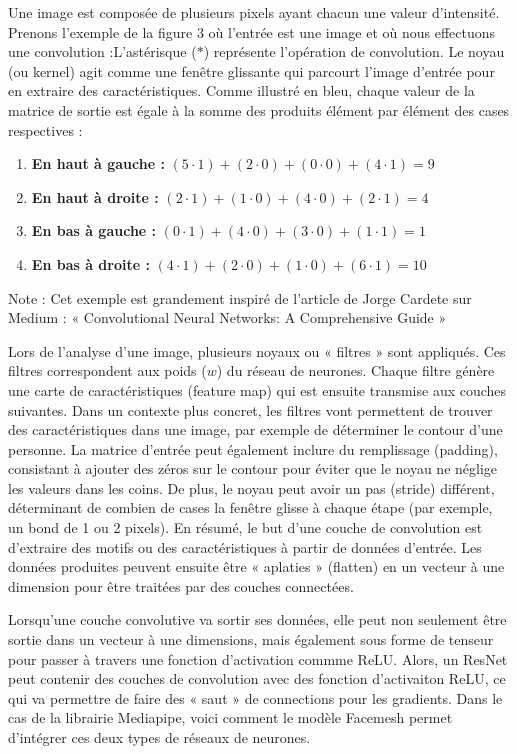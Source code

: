 \documentclass{rapportbrebeuf}
\begin{document}
Une image est composée de plusieurs pixels ayant chacun une valeur d’intensité. Prenons l’exemple de la figure 3 où l’entrée est une image et où nous effectuons une convolution :L’astérisque ($*$) représente l’opération de convolution. Le noyau (ou kernel) agit comme une fenêtre glissante qui parcourt l’image d’entrée pour en extraire des caractéristiques. Comme illustré en bleu, chaque valeur de la matrice de sortie est égale à la somme des produits élément par élément des cases respectives :

\begin{enumerate}
    \item \textbf{En haut à gauche :} $(5 \cdot 1) + (2 \cdot 0) + (0 \cdot 0) + (4 \cdot 1) = 9$
    \item \textbf{En haut à droite :} $(2 \cdot 1) + (1 \cdot 0) + (4 \cdot 0) + (2 \cdot 1) = 4$
    \item \textbf{En bas à gauche :} $(0 \cdot 1) + (4 \cdot 0) + (3 \cdot 0) + (1 \cdot 1) = 1$
    \item \textbf{En bas à droite :} $(4 \cdot 1) + (2 \cdot 0) + (1 \cdot 0) + (6 \cdot 1) = 10$
\end{enumerate}

Note : Cet exemple est grandement inspiré de l'article de Jorge Cardete sur Medium : « Convolutional Neural Networks: A Comprehensive Guide » \cite{cardete2024cnn}


Lors de l'analyse d’une image, plusieurs noyaux ou « filtres » sont appliqués. Ces filtres correspondent aux poids ($w$) du réseau de neurones. Chaque filtre génère une carte de caractéristiques (feature map) qui est ensuite transmise aux couches suivantes. Dans un contexte plus concret, les filtres vont permettent de trouver des caractéristiques dans une image, par exemple de déterminer le contour d'une personne. La matrice d'entrée peut également inclure du remplissage (padding), consistant à ajouter des zéros sur le contour pour éviter que le noyau ne néglige les valeurs dans les coins. De plus, le noyau peut avoir un pas (stride) différent, déterminant de combien de cases la fenêtre glisse à chaque étape (par exemple, un bond de 1 ou 2 pixels). En résumé, le but d’une couche de convolution est d'extraire des motifs ou des caractéristiques à partir de données d’entrée. Les données produites peuvent ensuite être « aplaties » (flatten) en un vecteur à une dimension pour être traitées par des couches connectées.

Lorsqu'une couche convolutive va sortir ses données, elle peut non seulement être sortie dans un vecteur à une dimensions, mais également sous forme de tenseur pour passer à travers une fonction d'activation commme ReLU.
Alors, un ResNet peut contenir des couches de convolution avec des fonction d'activaiton ReLU, ce qui va permettre de faire des « saut » de connections pour les gradients.
Dans le cas de la librairie Mediapipe, voici comment le modèle Facemesh permet d'intégrer ces deux types de réseaux de neurones.
\end{document}
